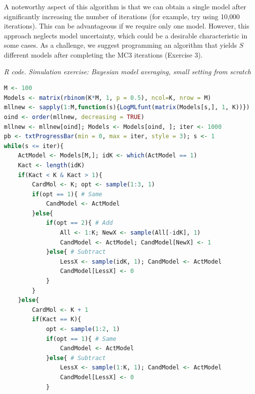 A noteworthy aspect of this algorithm is that we can obtain a single model after significantly increasing the number of iterations (for example, try using 10,000 iterations). This can be advantageous if we require only one model. However, this approach neglects model uncertainty, which could be a desirable characteristic in some cases. As a challenge, we suggest programming an algorithm that yields $S$ different models after completing the MC3 iterations (Exercise 3).

\begin{tcolorbox}[enhanced,width=4.67in,center upper,
	fontupper=\large\bfseries,drop shadow southwest,sharp corners]
	\textit{R code. Simulation exercise: Bayesian model averaging, small setting from scratch}
	\begin{VF}
		\begin{lstlisting}[language=R]
M <- 100
Models <- matrix(rbinom(K*M, 1, p = 0.5), ncol=K, nrow = M)
mllnew <- sapply(1:M,function(s){LogMLfunt(matrix(Models[s,], 1, K))})
oind <- order(mllnew, decreasing = TRUE)
mllnew <- mllnew[oind]; Models <- Models[oind, ]; iter <- 1000
pb <- txtProgressBar(min = 0, max = iter, style = 3); s <- 1
while(s <= iter){
	ActModel <- Models[M,]; idK <- which(ActModel == 1)
	Kact <- length(idK)
	if(Kact < K & Kact > 1){
		CardMol <- K; opt <- sample(1:3, 1)
		if(opt == 1){ # Same
			CandModel <- ActModel
		}else{
			if(opt == 2){ # Add
				All <- 1:K; NewX <- sample(All[-idK], 1)
				CandModel <- ActModel; CandModel[NewX] <- 1
			}else{ # Subtract
				LessX <- sample(idK, 1); CandModel <- ActModel
				CandModel[LessX] <- 0
			}
		}
	}else{
		CardMol <- K + 1
		if(Kact == K){
			opt <- sample(1:2, 1)
			if(opt == 1){ # Same
				CandModel <- ActModel
			}else{ # Subtract
				LessX <- sample(1:K, 1); CandModel <- ActModel
				CandModel[LessX] <- 0
			}
\end{lstlisting}
	\end{VF}
\end{tcolorbox} 

